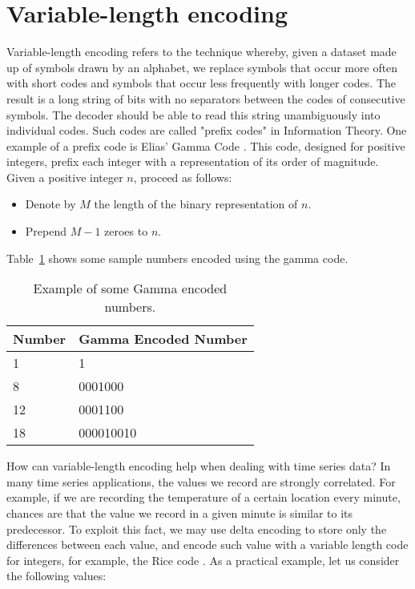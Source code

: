 \section{Variable-length encoding}
Variable-length encoding refers to the technique whereby, given a dataset made up of symbols
drawn by an alphabet, we replace symbols that occur more often with short codes and symbols
that occur less frequently with longer codes. The result is a long string of bits with no
separators between the codes of consecutive symbols. The decoder should be able to read this
string unambiguously into individual codes. Such codes are called "prefix codes"  in
Information Theory.
One example of a prefix code is Elias’ Gamma Code \cite{Elias1975Universal}. This code, designed for positive
integers, prefix each integer with a representation of its order of magnitude. Given a
positive integer $n$, proceed as follows:
\begin{itemize}
	\item Denote by $M$ the length of the binary representation of $n$.
	\item Prepend $M-1$ zeroes to $n$.
\end{itemize}\par
Table~\ref{tab:elias} shows some sample numbers encoded using the gamma code.
\begin{table}[]
\centering
\begin{tabular}{l|l}
\textbf{Number}     & \textbf{Gamma Encoded Number} \\ 
\hline
1          & 1                    \\ 
8          & 0001000              \\ 
12         & 0001100              \\ 
18         & 000010010            \\ 
\end{tabular}
\caption{Example of some Gamma encoded numbers.}
\label{tab:elias}
\end{table}
How can variable-length encoding help when dealing with time series data?
In many time series applications, the values we record are strongly correlated.
For example, if we are recording the temperature of a certain location every minute,
chances are that the value we record in a given minute is similar to its predecessor.
To exploit this fact, we may use delta encoding to store only the differences between each
value, and encode such value with a variable length code for integers, for example, the
Rice code \cite{Rice1979Some}. As a practical example, let us consider the following values:
